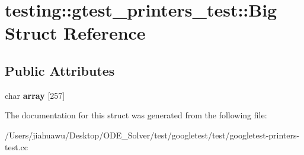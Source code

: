 \hypertarget{structtesting_1_1gtest__printers__test_1_1_big}{}\section{testing\+:\+:gtest\+\_\+printers\+\_\+test\+:\+:Big Struct Reference}
\label{structtesting_1_1gtest__printers__test_1_1_big}
\subsection*{Public Attributes}
\begin{DoxyCompactItemize}
\item 
\mbox{\label{structtesting_1_1gtest__printers__test_1_1_big_a863911a8ec5c3bbe79c44d399f1de61f}} 
char {\bfseries array} \mbox{[}257\mbox{]}
\end{DoxyCompactItemize}


The documentation for this struct was generated from the following file\+:\begin{DoxyCompactItemize}
\item 
/\+Users/jiahuawu/\+Desktop/\+O\+D\+E\+\_\+\+Solver/test/googletest/test/googletest-\/printers-\/test.\+cc\end{DoxyCompactItemize}
